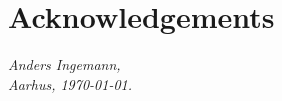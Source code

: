 \chapter*{Acknowledgements}
\label{chap:ack}

\todo{\dots}

\vspace{2ex}
\begin{flushright}
  \emph{Anders Ingemann,}\\
  \emph{Aarhus, \today.}
\end{flushright}
